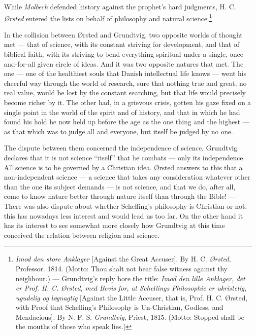 \documentclass[12pt,a4paper]{book}
\newcommand{\opage}[1]{\marginnote{\footnotesize\textit{[#1]}}}
\begin{document}
While \emph{Molbech} defended history against the prophet's hard judgments, H. C. \emph{Ørsted}
entered the lists on behalf of philosophy and natural science.\footnote{\emph{Imod den
store Anklager} [Against the Great Accuser]. By H. C. \emph{Ørsted}, Professor. 1814. (Motto:
Thou shalt not bear false witness against thy neighbour.) --- Grundtvig's reply bore
the title: \emph{Imod den lille Anklager, det er Prof. H. C. Ørsted, med Bevis for, at
Schellings Philosophie er ukristelig, ugudelig og løgnagtig} [Against the Little
Accuser, that is, Prof. H. C. Ørsted, with Proof that Schelling's Philosophy is
Un-Christian, Godless, and Mendacious]. By N. F. S. \emph{Grundtvig}, Priest, 1815. (Motto:
Stopped shall be the mouths of those who speak lies.)}

In the collision between Ørsted and Grundtvig, two opposite worlds of thought met ---
that of science, with its constant striving for development, and that of biblical
faith, with its striving to bend everything spiritual under a single, once-and-for-all
given circle of ideas. And it was two opposite natures that met. The one --- one of
the healthiest souls that Danish intellectual life knows --- went his cheerful way
through the world of research, sure that nothing true and great, no real value, would
be lost by the constant searching, but that life would precisely become richer by it.
The other had, in a grievous crisis, gotten his gaze fixed on a single point in the
world of the spirit and of history, and that in which he had found his hold he now
held up before the age as the one thing and the highest --- as that which was to judge
all and everyone, but itself be judged by no one.

The dispute between them concerned the independence of science. Grundtvig declares
that it is not science ``itself'' that he combats --- only its independence. All
science is to be governed by a Christian idea. Ørsted answers to this that a
non-independent science --- a science that takes any consideration whatever other than
the one its subject demands --- is not science, and that we do, after all, come to
know nature better through nature itself than through the Bible! --- There was also
dispute about whether Schelling's philosophy is Christian or not; \opage{62}this has nowadays
less interest and would lead us too far. On the other hand it has its interest to see
somewhat more closely how Grundtvig at this time conceived the relation between
religion and science.
\end{document}
